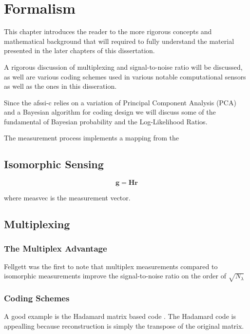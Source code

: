 \chapter{Formalism}\label{chap:Formalism}

This chapter introduces the reader to the more rigorous concepts and mathematical background that will required to fully understand the material presented in the later chapters of this dissertation. 

A rigorous discussion of multiplexing and signal-to-noise ratio will be discussed, as well are various coding schemes used in various notable computational sensors as well as the ones in this disseration. 

Since the \gls{afssi-c} relies on a variation of Principal Component Analysis (PCA) and a Bayesian algorithm for coding design we will discuss some of the fundamental of Bayesian probability and the Log-Likelihood Ratios. 

The measurement process implements a mapping from the 


\section{Isomorphic Sensing}

\begin{equation}
\mathbf{g} = \mathbf{Hr}
\end{equation}

where \gls{measvec} is the measurement vector.

\section{Multiplexing}

\subsection{The Multiplex Advantage}
Fellgett was the first to note that multiplex measurements compared to isomorphic measurements improve the signal-to-noise ratio on the order of $ \sqrt{N_{\lambda}}$

\subsection{Coding Schemes}

A good example is the Hadamard matrix based code \cite{sloane1969codes}. The Hadamard code is appealling because reconstruction is simply the transpose of the original matrix. 

